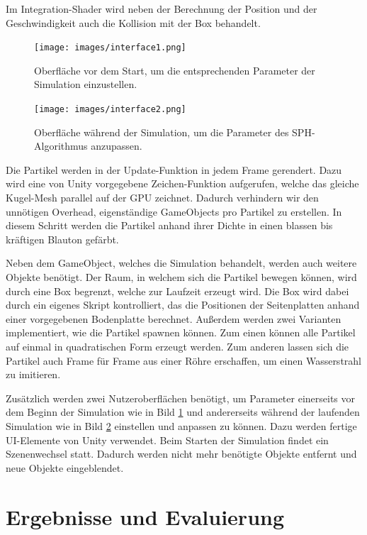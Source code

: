 \documentclass[a4paper]{paper}
\begin{document}
Im Integration-Shader wird neben der Berechnung der Position und der Geschwindigkeit auch die Kollision mit der Box behandelt.


\begin{figure}[t]
	\centering
	\texttt{[image: images/interface1.png]}
	\caption{Oberfläche vor dem Start, um die entsprechenden Parameter der Simulation einzustellen.}
	\label{fig:interface1}
\end{figure}

\begin{figure}[t]
	\centering
	\texttt{[image: images/interface2.png]}
	\caption{Oberfläche während der Simulation, um die Parameter des SPH-Algorithmus anzupassen.}
	\label{fig:interface2}
\end{figure}



Die Partikel werden in der Update-Funktion in jedem Frame gerendert. Dazu wird eine von Unity vorgegebene Zeichen-Funktion aufgerufen, welche das gleiche Kugel-Mesh parallel auf der GPU zeichnet. Dadurch verhindern wir den unnötigen Overhead, eigenständige GameObjects pro Partikel zu erstellen. In diesem Schritt werden die Partikel anhand ihrer Dichte in einen blassen bis kräftigen Blauton gefärbt.

Neben dem GameObject, welches die Simulation behandelt, werden auch weitere Objekte benötigt. Der Raum, in welchem sich die Partikel bewegen können, wird durch eine Box begrenzt, welche zur Laufzeit erzeugt wird. Die Box wird dabei durch ein eigenes Skript kontrolliert, das die Positionen der Seitenplatten anhand einer vorgegebenen Bodenplatte berechnet.
Außerdem werden zwei Varianten implementiert, wie die Partikel spawnen können. Zum einen können alle Partikel auf einmal in quadratischen Form erzeugt werden. Zum anderen lassen sich die Partikel auch Frame für Frame aus einer Röhre erschaffen, um einen Wasserstrahl zu imitieren.

Zusätzlich werden zwei Nutzeroberflächen benötigt, um Parameter einerseits vor dem Beginn der Simulation wie in Bild \ref{fig:interface1} und andererseits während der laufenden Simulation wie in Bild \ref{fig:interface2} einstellen und anpassen zu können. Dazu werden fertige UI-Elemente von Unity verwendet. Beim Starten der Simulation findet ein Szenenwechsel statt. Dadurch werden nicht mehr benötigte Objekte entfernt und neue Objekte eingeblendet.


\section{Ergebnisse und Evaluierung}
\end{document}
